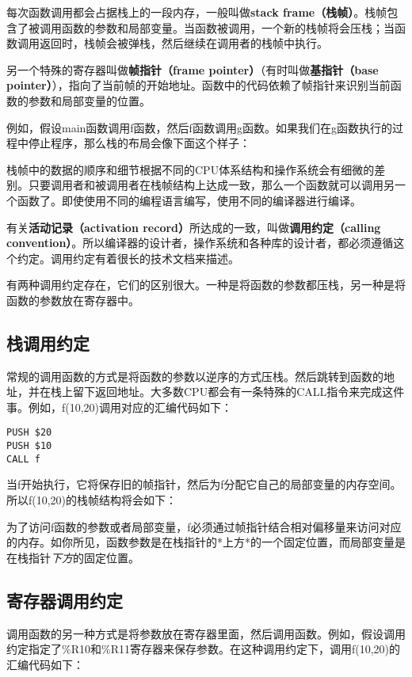 \documentclass[cn,11pt,chinese]{elegantbook}
\begin{document}
每次函数调用都会占据栈上的一段内存，一般叫做\textbf{stack frame（栈帧）}。栈帧包含了被调用函数的参数和局部变量。当函数被调用，一个新的栈帧将会压栈；当函数调用返回时，栈帧会被弹栈，然后继续在调用者的栈帧中执行。

另一个特殊的寄存器叫做\textbf{帧指针（frame pointer）}（有时叫做\textbf{基指针（base pointer）}），指向了当前帧的开始地址。函数中的代码依赖了帧指针来识别当前函数的参数和局部变量的位置。

例如，假设main函数调用f函数，然后f函数调用g函数。如果我们在g函数执行的过程中停止程序，那么栈的布局会像下面这个样子：

栈帧中的数据的顺序和细节根据不同的CPU体系结构和操作系统会有细微的差别。只要调用者和被调用者在栈帧结构上达成一致，那么一个函数就可以调用另一个函数了。即使使用不同的编程语言编写，使用不同的编译器进行编译。

有关\textbf{活动记录（activation record）}所达成的一致，叫做\textbf{调用约定（calling convention）}。所以编译器的设计者，操作系统和各种库的设计者，都必须遵循这个约定。调用约定有着很长的技术文档来描述。

有两种调用约定存在，它们的区别很大。一种是将函数的参数都压栈，另一种是将函数的参数放在寄存器中。

\subsection{栈调用约定}

常规的调用函数的方式是将函数的参数以逆序的方式压栈。然后跳转到函数的地址，并在栈上留下返回地址。大多数CPU都会有一条特殊的CALL指令来完成这件事。例如，f(10,20)调用对应的汇编代码如下：

\begin{verbatim}
PUSH $20
PUSH $10
CALL f
\end{verbatim}

当f开始执行，它将保存旧的帧指针，然后为f分配它自己的局部变量的内存空间。所以f(10,20)的栈帧结构将会如下：

为了访问f函数的参数或者局部变量，f必须通过帧指针结合相对偏移量来访问对应的内存。如你所见，函数参数是在栈指针的*上方*的一个固定位置，而局部变量是在栈指针\textit{下方}的固定位置。

\subsection{寄存器调用约定}

调用函数的另一种方式是将参数放在寄存器里面，然后调用函数。例如，假设调用约定指定了\%R10和\%R11寄存器来保存参数。在这种调用约定下，调用f(10,20)的汇编代码如下：
\end{document}
